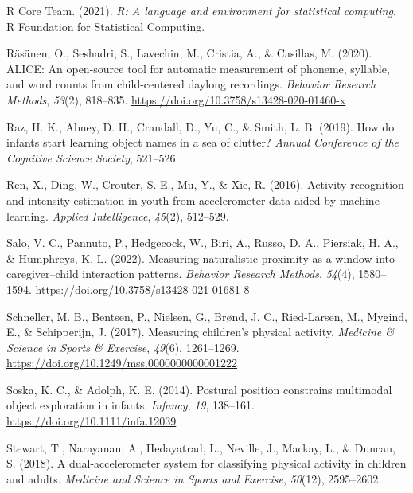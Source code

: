 \documentclass[
  man]{apa6}
\newlength{\cslhangindent}
\newlength{\cslentryspacingunit} %
\newenvironment{CSLReferences}[2] %
 {%
  \setlength{\parindent}{0pt}
  \ifodd #1
  \let\oldpar\par
  \def\par{\hangindent=\cslhangindent\oldpar}
  \fi
  \setlength{\parskip}{#2\cslentryspacingunit}
 }%
 {}
\begin{document}
\begin{CSLReferences}{1}{0}
\leavevmode{}%
R Core Team. (2021). \emph{R: A language and environment for statistical computing}. {R Foundation for Statistical Computing}.

\leavevmode{}%
Räsänen, O., Seshadri, S., Lavechin, M., Cristia, A., \& Casillas, M. (2020). {ALICE}: An open-source tool for automatic measurement of phoneme, syllable, and word counts from child-centered daylong recordings. \emph{Behavior Research Methods}, \emph{53}(2), 818--835. \url{https://doi.org/10.3758/s13428-020-01460-x}

\leavevmode{}%
Raz, H. K., Abney, D. H., Crandall, D., Yu, C., \& Smith, L. B. (2019). How do infants start learning object names in a sea of clutter? \emph{Annual Conference of the Cognitive Science Society}, 521--526.

\leavevmode{}%
Ren, X., Ding, W., Crouter, S. E., Mu, Y., \& Xie, R. (2016). Activity recognition and intensity estimation in youth from accelerometer data aided by machine learning. \emph{Applied Intelligence}, \emph{45}(2), 512--529.

\leavevmode{}%
Salo, V. C., Pannuto, P., Hedgecock, W., Biri, A., Russo, D. A., Piersiak, H. A., \& Humphreys, K. L. (2022). Measuring naturalistic proximity as a window into caregiver--child interaction patterns. \emph{Behavior Research Methods}, \emph{54}(4), 1580--1594. \url{https://doi.org/10.3758/s13428-021-01681-8}

\leavevmode{}%
Schneller, M. B., Bentsen, P., Nielsen, G., Brønd, J. C., Ried-Larsen, M., Mygind, E., \& Schipperijn, J. (2017). Measuring children's physical activity. \emph{Medicine \& Science in Sports \& Exercise}, \emph{49}(6), 1261--1269. \url{https://doi.org/10.1249/mss.0000000000001222}

\leavevmode{}%
Soska, K. C., \& Adolph, K. E. (2014). Postural position constrains multimodal object exploration in infants. \emph{Infancy}, \emph{19}, 138--161. \url{https://doi.org/10.1111/infa.12039}

\leavevmode{}%
Stewart, T., Narayanan, A., Hedayatrad, L., Neville, J., Mackay, L., \& Duncan, S. (2018). A dual-accelerometer system for classifying physical activity in children and adults. \emph{Medicine and Science in Sports and Exercise}, \emph{50}(12), 2595--2602.


\end{CSLReferences}
\end{document}
